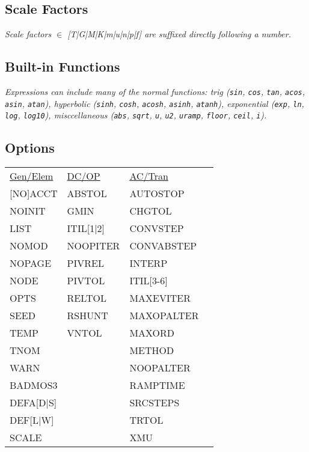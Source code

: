 \subsection*{Scale Factors}

\textit{Scale factors $\in$ [T|G|M|K|m|u|n|p|f] are suffixed directly following a number.}\\


\subsection*{Built-in Functions}

\textit{Expressions can include many of the normal functions: trig (\texttt{sin}, \texttt{cos}, \texttt{tan}, \texttt{acos}, \texttt{asin}, \texttt{atan}), hyperbolic (\texttt{sinh}, \texttt{cosh}, \texttt{acosh}, \texttt{asinh}, \texttt{atanh}), exponential (\texttt{exp}, \texttt{ln}, \texttt{log}, \texttt{log10}), misccellaneous (\texttt{abs}, \texttt{sqrt}, \texttt{u}, \texttt{u2}, \texttt{uramp}, \texttt{floor}, \texttt{ceil}, \texttt{i}).} \\


\subsection*{Options}
{\scriptsize
\begin{tabular}{l l l l}
    \underline{Gen/Elem} & \underline{DC/OP} & \underline{AC/Tran} \\[1mm]
    {[NO]}ACCT & ABSTOL & AUTOSTOP   &   \\
    NOINIT  & GMIN      & CHGTOL  &   \\
    LIST    & ITIL[1|2] & CONVSTEP  &   \\
    NOMOD   & NOOPITER  & CONVABSTEP  &   \\
    NOPAGE  & PIVREL    & INTERP  &   \\
    NODE    & PIVTOL    & ITIL[3-6]  &   \\
    OPTS    & RELTOL    & MAXEVITER  &   \\
    SEED    & RSHUNT    & MAXOPALTER  &   \\
    TEMP    & VNTOL     & MAXORD  &   \\
    TNOM    &           & METHOD  &   \\
    WARN    &           & NOOPALTER  &   \\
    BADMOS3 &           & RAMPTIME  &   \\
    DEFA[D|S] &           & SRCSTEPS  &   \\
    DEF[L|W] &           & TRTOL  &   \\
    SCALE &           & XMU  &   \\
\end{tabular}}
\ \\

